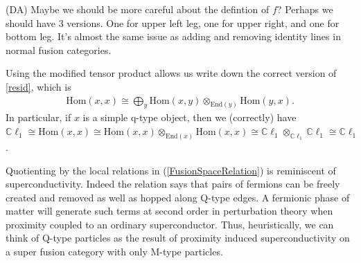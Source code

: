 \documentclass[12pt,a4paper]{article}
\newcommand{\tp}{\otimes}
\newcommand{\Hom}{\text{Hom}}
\newcommand{\End}{\text{End}}
\newcommand{\cl}{\mathbb{C}\ell}
\newcommand{\dave}[1]{{\color{ao(english)}\footnotesize{(DA) #1}}}
\begin{document}
\dave{Maybe we should be more careful about the defintion of $f$? Perhaps we should have 3 versions. One for upper left leg, one for upper right, and one for bottom leg. It's almost the same issue as adding and removing identity lines in normal fusion categories.}


Using the modified tensor product allows us write down the correct version of \eqref{resid}, which is 
\begin{align}
\Hom(x,x) \cong \bigoplus_y \Hom(x,y) \tp_{\End(y)} \Hom(y,x).
\end{align}
In particular, if $x$ is a simple q-type object, then we (correctly) have $\cl_1 \cong \Hom(x,x) \cong \Hom(x,x)\tp_{\End(x)} \Hom(x,x) \cong \cl_1\tp_{\cl_1}\cl_1 \cong \cl_1$.  

Quotienting by the local relations in (\ref{FusionSpaceRelation}) is reminiscent of superconductivity. 
Indeed the relation says that pairs of fermions can be freely created and removed as well as hopped along Q-type edges. 
A fermionic phase of matter will generate such terms at second order in perturbation theory when proximity coupled to an  ordinary superconductor.
Thus, heuristically, we can think of Q-type particles as the result of proximity induced superconductivity on a super fusion category with only M-type particles.



\end{document}
